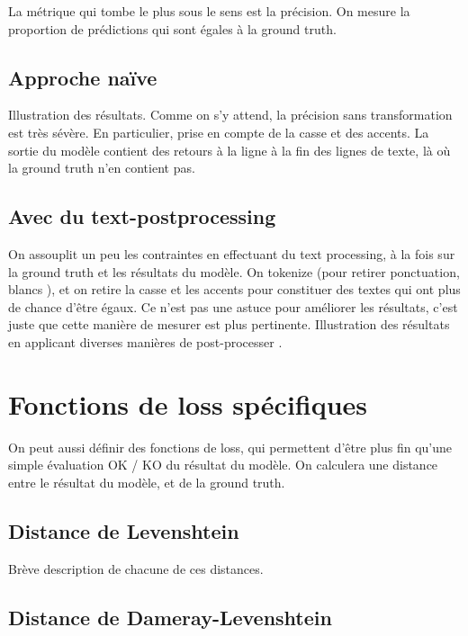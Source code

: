         La métrique qui tombe le plus sous le sens est la précision.
        On mesure la proportion de prédictions qui sont égales à la ground truth.

            \subsection{Approche naïve}

            Illustration des résultats. 
            Comme on s'y attend, la précision sans transformation est très sévère.
            En particulier, prise en compte de la casse et des accents.
            La sortie du modèle contient des retours à la ligne à la fin des lignes de texte, là où la ground truth n'en contient pas.

            \subsection{Avec du \og text-postprocessing \fg}
        
            On assouplit un peu les contraintes en effectuant du text processing, à la fois sur la ground truth et les résultats du modèle.
            On tokenize (pour retirer ponctuation, \og blancs \fg), et on retire la casse et les accents pour constituer des textes qui ont plus de chance d'être égaux.
            Ce n'est pas une astuce pour améliorer les résultats, c'est juste que cette manière de mesurer est plus pertinente.
            Illustration des résultats en applicant diverses manières de \og post-processer \fg.

        \section{Fonctions de \og loss \fg spécifiques}

        On peut aussi définir des fonctions de loss, qui permettent d'être plus fin qu'une simple évaluation OK / KO du résultat du modèle.
        On calculera une distance entre le résultat du modèle, et de la ground truth.

            \subsection{Distance de Levenshtein}

            Brève description de chacune de ces distances.

            \subsection{Distance de Dameray-Levenshtein}

